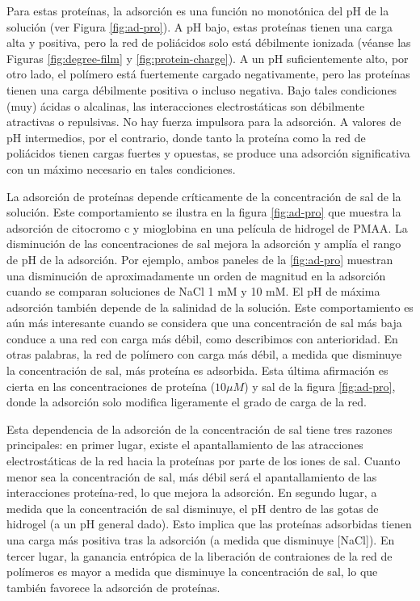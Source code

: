 Para estas prote\'inas, la adsorci\'on es una funci\'on no monot\'onica del pH de la soluci\'on (ver Figura \ref{fig:ad-pro}). A pH bajo, estas prote\'inas tienen una carga alta y positiva, pero la red de poli\'acidos solo está d\'ebilmente ionizada (v\'eanse las Figuras \ref{fig:degree-film} y \ref{fig:protein-charge}). A un pH suficientemente alto, por otro lado, el pol\'imero est\'a fuertemente cargado negativamente, pero las prote\'inas tienen una carga d\'ebilmente positiva o incluso negativa. Bajo tales condiciones (muy) \'acidas o alcalinas, las interacciones electrost\'aticas son d\'ebilmente atractivas o repulsivas. No hay fuerza impulsora para la adsorci\'on. A valores de pH intermedios, por el contrario, donde tanto la prote\'ina como la red de poli\'acidos tienen cargas fuertes y opuestas, se produce una adsorci\'on significativa con un m\'aximo necesario en tales condiciones.

La adsorci\'on de prote\'inas depende cr\'iticamente de la concentraci\'on de sal de la soluci\'on. Este comportamiento se ilustra en la figura \ref{fig:ad-pro} que muestra la adsorci\'on de citocromo c  y mioglobina en una pel\'icula de hidrogel de PMAA. La disminuci\'on de las concentraciones de sal mejora la adsorci\'on y ampl\'ia el rango de pH de la adsorci\'on. Por ejemplo, ambos paneles de la \ref{fig:ad-pro} muestran una disminuci\'on de aproximadamente un orden de magnitud en la adsorci\'on cuando se comparan soluciones de NaCl 1 mM y 10 mM. El pH de m\'axima adsorci\'on tambi\'en depende de la salinidad de la soluci\'on. Este comportamiento es a\'un m\'as interesante cuando se considera que una concentraci\'on de sal m\'as baja conduce a una red con carga m\'as d\'ebil, como describimos con anterioridad. En otras palabras, la red de pol\'imero con carga m\'as d\'ebil, a medida que disminuye la concentraci\'on de sal, m\'as prote\'ina es adsorbida. Esta \'ultima afirmaci\'on es cierta en las concentraciones de prote\'ina ($10 \mu M$) y sal de la figura \ref{fig:ad-pro}, donde la adsorci\'on solo modifica ligeramente el grado de carga de la red.

Esta dependencia de la adsorci\'on de la concentraci\'on de sal tiene tres razones principales: en primer lugar, existe el apantallamiento  de las atracciones electrost\'aticas de la red hacia la prote\'inas por parte de los iones de sal. Cuanto menor sea la concentraci\'on de sal, m\'as débil ser\'a el apantallamiento de las interacciones prote\'ina-red, lo que mejora la adsorci\'on. En segundo lugar, a medida que la concentraci\'on de sal disminuye, el pH dentro de las gotas de hidrogel (a un pH general dado). Esto implica que las prote\'inas adsorbidas tienen una carga m\'as positiva tras la adsorci\'on (a medida que disminuye [NaCl]). En tercer lugar, la ganancia entr\'opica de la liberaci\'on de contraiones de la red de pol\'imeros es mayor a medida que disminuye la concentraci\'on de sal, lo que tambi\'en favorece la adsorci\'on de prote\'inas.



